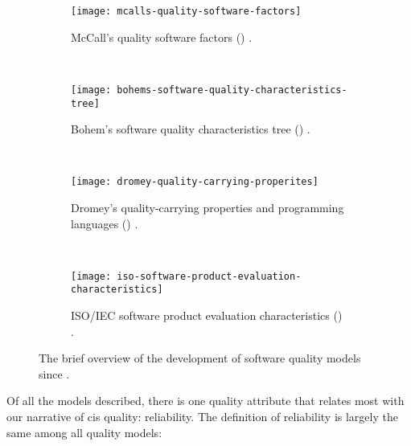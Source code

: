 \begin{figure}[htp]
  \centering
  \begin{subfigure}[b]{0.49\linewidth}
    \centering
    \texttt{[image: mcalls-quality-software-factors]}
    \caption{McCall's quality software factors (\citeyear{McCall:1977wm}) \citep{McCall:1977wm}.}
    \label{fig:literature-review:software-quality:quality-models:development:mccall}
  \end{subfigure}
  ~
  \begin{subfigure}[b]{0.49\linewidth}
    \centering
    \texttt{[image: bohems-software-quality-characteristics-tree]}
    \caption{Bohem's software quality characteristics tree (\citeyear{Boehm:1978vv}) \citep{Boehm:1978vv}.}
    \label{fig:literature-review:software-quality:quality-models:development:boehm}
  \end{subfigure}
  ~
  \begin{subfigure}[t]{0.49\linewidth}
    \centering
    \texttt{[image: dromey-quality-carrying-properites]}
    \caption{Dromey's quality-carrying properties and programming languages (\citeyear{Dromey:1995wy}) \citep{Dromey:1995wy}.}
    \label{fig:literature-review:software-quality:quality-models:development:dromey}
  \end{subfigure}
  ~
  \begin{subfigure}[t]{0.49\linewidth}
    \centering
    \texttt{[image: iso-software-product-evaluation-characteristics]}
    \caption{ISO/IEC software product evaluation characteristics (\citeyear{ISO9126:1999}) \citep{ISO9126:1999}.}
    \label{fig:literature-review:software-quality:quality-models:development:iso}
  \end{subfigure}
  \caption{The brief overview of the development of software quality models since \citeyear{McCall:1977wm}.}
  \label{fig:literature-review:software-quality:quality-models:development}
\end{figure}

Of all the models described, there is one quality attribute that relates most with our narrative of \gls{cis} quality: reliability. The definition of reliability is largely the same among all quality models:

